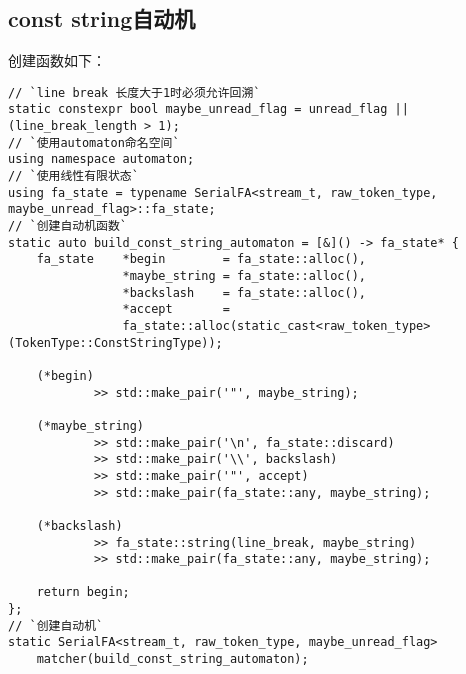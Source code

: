 \documentclass[UTF8]{ctexart}
\newcommand{\fira}[1]{{\firacode {}#1}}
\begin{document}
\subsection{const string自动机}
\begin{figure}[!h]
    \centering
\end{figure}
\par 创建函数如下：

{\firacode
\begin{lstlisting}[language={[ANSI]C++}]
// `line break 长度大于1时必须允许回溯`
static constexpr bool maybe_unread_flag = unread_flag || (line_break_length > 1);
// `使用automaton命名空间`
using namespace automaton;
// `使用线性有限状态`
using fa_state = typename SerialFA<stream_t, raw_token_type, maybe_unread_flag>::fa_state;
// `创建自动机函数`
static auto build_const_string_automaton = [&]() -> fa_state* {
    fa_state    *begin        = fa_state::alloc(),
                *maybe_string = fa_state::alloc(),
                *backslash    = fa_state::alloc(),
                *accept       =
                fa_state::alloc(static_cast<raw_token_type>(TokenType::ConstStringType));
    
    (*begin)
            >> std::make_pair('"', maybe_string);
    
    (*maybe_string)
            >> std::make_pair('\n', fa_state::discard)
            >> std::make_pair('\\', backslash)
            >> std::make_pair('"', accept)
            >> std::make_pair(fa_state::any, maybe_string);
            
    (*backslash)
            >> fa_state::string(line_break, maybe_string)
            >> std::make_pair(fa_state::any, maybe_string);

    return begin;
};
// `创建自动机`
static SerialFA<stream_t, raw_token_type, maybe_unread_flag>
    matcher(build_const_string_automaton);
\end{lstlisting}
}
\end{document}
